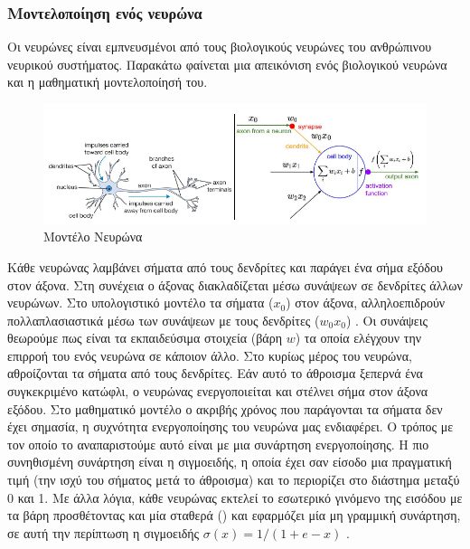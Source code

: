\subsubsection{Μοντελοποίηση ενός νευρώνα}

Οι νευρώνες είναι εμπνευσμένοι από τους βιολογικούς νευρώνες του ανθρώπινου νευρικού συστήματος. Παρακάτω φαίνεται μια απεικόνιση ενός βιολογικού νευρώνα και η μαθηματική μοντελοποίησή του.\cite{cs231n} 

\begin{figure}[h]
\centering
\includegraphics[scale=0.5]{images/Ch2/cs231n_neuron.png}
\caption{Μοντέλο Νευρώνα}
\label{fig:neuron model}
\end{figure}

Κάθε νευρώνας λαμβάνει σήματα από τους δενδρίτες και παράγει ένα σήμα εξόδου στον άξονα. Στη συνέχεια ο άξονας διακλαδίζεται μέσω συνάψεων σε δενδρίτες άλλων νευρώνων. Στο υπολογιστικό μοντέλο τα σήματα ($x_0$) στον άξονα, αλληλοεπιδρούν πολλαπλασιαστικά μέσω των συνάψεων με τους δενδρίτες ($w_0 x_0$) . Οι συνάψεις θεωρούμε πως είναι τα εκπαιδεύσιμα  στοιχεία (βάρη $w$)  τα οποία ελέγχουν την επιρροή του ενός νευρώνα σε κάποιον άλλο. Στο κυρίως μέρος του νευρώνα, αθροίζονται τα σήματα από τους δενδρίτες. Εάν αυτό το άθροισμα ξεπερνά ένα συγκεκριμένο κατώφλι, ο νευρώνας ενεργοποιείται και στέλνει σήμα στον άξονα εξόδου. Στο μαθηματικό μοντέλο ο ακριβής χρόνος που παράγονται τα σήματα δεν έχει σημασία, η συχνότητα ενεργοποίησης του νευρώνα μας ενδιαφέρει. Ο τρόπος με τον οποίο το αναπαριστούμε  αυτό είναι με μια συνάρτηση ενεργοποίησης. Η πιο συνηθισμένη συνάρτηση είναι η σιγμοειδής, η οποία έχει σαν είσοδο μια πραγματική τιμή (την ισχύ του σήματος μετά το άθροισμα) και το περιορίζει στο διάστημα μεταξύ 0 και 1. Με άλλα λόγια, κάθε νευρώνας εκτελεί το εσωτερικό γινόμενο της εισόδου με τα βάρη προσθέτοντας και μία σταθερά () και εφαρμόζει μία μη γραμμική συνάρτηση, σε αυτή την περίπτωση η σιγμοειδής  $σ(x)=1/(1+e-x)$ .

